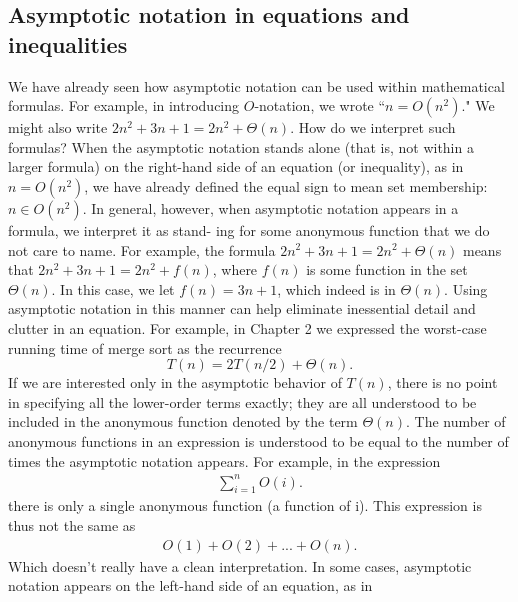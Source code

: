 \documentclass{report}
\begin{document}
        \bigbreak \noindent 
        \subsection{Asymptotic notation in equations and inequalities}
        \bigbreak \noindent 
        We have already seen how asymptotic notation can be used within mathematical 
        formulas. For example, in introducing $O$-notation, we wrote ``$n = O(n^2)$." We 
        might also write $2n^2 + 3n + 1 = 2n^2 + \Theta(n)$. How do we interpret such formulas? 
        \bigbreak \noindent 
        When the asymptotic notation stands alone (that is, not within a larger formula) 
        on the right-hand side of an equation (or inequality), as in $n = O(n^2)$, we have 
        already defined the equal sign to mean set membership: $n \in O(n^2)$. In general, 
        however, when asymptotic notation appears in a formula, we interpret it as stand-
        ing for some anonymous function that we do not care to name. For example, the 
        formula $2n^2 + 3n + 1 = 2n^2 + \Theta(n)$ means that $2n^2 + 3n + 1 = 2n^2 + f(n)$, 
        where $f(n)$ is some function in the set $\Theta(n)$. In this case, we let $f(n) = 3n + 1$, 
        which indeed is in $\Theta(n)$.
        \bigbreak \noindent 
        Using asymptotic notation in this manner can help eliminate inessential detail 
        and clutter in an equation. For example, in Chapter 2 we expressed the worst-case 
        running time of merge sort as the recurrence
        \[
            T(n) = 2T(n/2) + \Theta(n).
        \]
        If we are interested only in the asymptotic behavior of $T(n)$, there is no point in 
        specifying all the lower-order terms exactly; they are all understood to be included 
        in the anonymous function denoted by the term $\Theta(n)$.
        \bigbreak \noindent 
        The number of anonymous functions in an expression is understood to be equal 
        to the number of times the asymptotic notation appears. For example, in the expression
        \begin{align*}
            \sum_{i=1}^{n}O(i)
        .\end{align*}
        \bigbreak \noindent 
        there is only a single anonymous function (a function of i). This expression is thus not the same as
        \begin{align*}
            O(1) + O(2) + ... + O(n)
        .\end{align*}
        Which doesn’t really have a clean interpretation. In some cases, asymptotic notation appears on the left-hand side of an equation, as in
\end{document}
